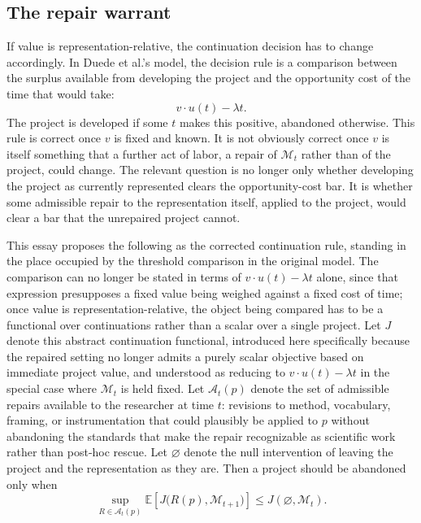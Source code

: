 \documentclass[11pt]{article}
\begin{document}
\subsection{The repair warrant}

If value is representation-relative, the continuation decision has to change accordingly. In Duede et al.'s model, the decision rule is a comparison between the surplus available from developing the project and the opportunity cost of the time that would take:
\[
v \cdot u(t) - \lambda t.
\]
The project is developed if some $t$ makes this positive, abandoned otherwise. This rule is correct once $v$ is fixed and known. It is not obviously correct once $v$ is itself something that a further act of labor, a repair of $\mathcal{M}_t$ rather than of the project, could change. The relevant question is no longer only whether developing the project as currently represented clears the opportunity-cost bar. It is whether some admissible repair to the representation itself, applied to the project, would clear a bar that the unrepaired project cannot.

This essay proposes the following as the corrected continuation rule, standing in the place occupied by the threshold comparison in the original model. The comparison can no longer be stated in terms of $v \cdot u(t) - \lambda t$ alone, since that expression presupposes a fixed value being weighed against a fixed cost of time; once value is representation-relative, the object being compared has to be a functional over continuations rather than a scalar over a single project. Let $J$ denote this abstract continuation functional, introduced here specifically because the repaired setting no longer admits a purely scalar objective based on immediate project value, and understood as reducing to $v \cdot u(t) - \lambda t$ in the special case where $\mathcal{M}_t$ is held fixed. Let $\mathcal{A}_t(p)$ denote the set of admissible repairs available to the researcher at time $t$: revisions to method, vocabulary, framing, or instrumentation that could plausibly be applied to $p$ without abandoning the standards that make the repair recognizable as scientific work rather than post-hoc rescue. Let $\varnothing$ denote the null intervention of leaving the project and the representation as they are. Then a project should be abandoned only when
\[
\sup_{R \in \mathcal{A}_t(p)} \mathbb{E}\left[J\big(R(p), \mathcal{M}_{t+1}\big)\right] \leq J(\varnothing, \mathcal{M}_t).
\]
\end{document}
